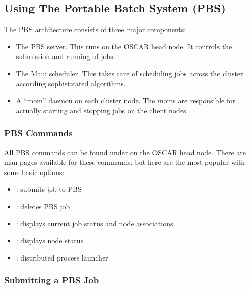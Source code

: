 %
%
%

\subsection{Using The Portable Batch System (PBS)}
\label{app:pbs-overview}

The PBS architecture consists of three major components:

\begin{itemize}
\item The PBS server.  This runs on the OSCAR head node.  It controls
  the submission and running of jobs.
  
\item The Maui scheduler.  This takes care of scheduling jobs across
  the cluster according sophisticated algorithms.

\item A ``mom'' daemon on each cluster node.  The moms are responsible
  for actually starting and stopping jobs on the client nodes.
\end{itemize}

\subsubsection{PBS Commands}

All PBS commands can be found under  on the
OSCAR head node.  There are man pages available for these commands,
but here are the most popular with some basic options:

\begin{itemize}
\item {}: submits job to PBS

\item {}: deletes PBS job
  
\item {}: displays current job status and node
  associations

\item {}: displays node status
  
\item {}: distributed process launcher
\end{itemize}

\subsubsection{Submitting a PBS Job}

